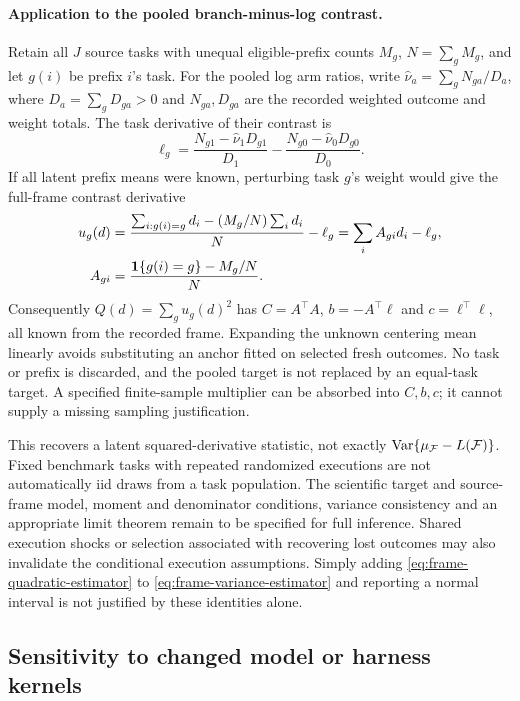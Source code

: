 \paragraph{Application to the pooled branch-minus-log contrast.}
Retain all $J$ source tasks with unequal eligible-prefix counts $M_g$, $N=\sum_gM_g$, and let $g(i)$ be prefix $i$'s task. For the pooled log arm ratios, write $\widehat\nu_a=\sum_gN_{ga}/D_a$, where $D_a=\sum_gD_{ga}>0$ and $N_{ga},D_{ga}$ are the recorded weighted outcome and weight totals. The task derivative of their contrast is
\[
 \ell_g=\frac{N_{g1}-\widehat\nu_1D_{g1}}{D_1}
 -\frac{N_{g0}-\widehat\nu_0D_{g0}}{D_0}.
\]
If all latent prefix means were known, perturbing task $g$'s weight would give the full-frame contrast derivative
\begin{equation}
 \begin{split}
 u_g(d)&=\frac{\sum_{i:g(i)=g}d_i-(M_g/N)\sum_i d_i}{N}-\ell_g
       =\sum_i A_{gi}d_i-\ell_g,\\
 A_{gi}&=\frac{\mathbf{1}\{g(i)=g\}-M_g/N}{N}.
 \end{split}
 \label{eq:frame-quadratic-derivative}
\end{equation}
Consequently $Q(d)=\sum_g u_g(d)^2$ has $C=A^\top A$, $b=-A^\top\ell$ and $c=\ell^\top\ell$, all known from the recorded frame. Expanding the unknown centering mean linearly avoids substituting an anchor fitted on selected fresh outcomes. No task or prefix is discarded, and the pooled target is not replaced by an equal-task target. A specified finite-sample multiplier can be absorbed into $C,b,c$; it cannot supply a missing sampling justification.

This recovers a latent squared-derivative statistic, not exactly $\operatorname{Var}\{\mu_{\mathcal F}-L(\mathcal F)\}$. Fixed benchmark tasks with repeated randomized executions are not automatically iid draws from a task population. The scientific target and source-frame model, moment and denominator conditions, variance consistency and an appropriate limit theorem remain to be specified for full inference. Shared execution shocks or selection associated with recovering lost outcomes may also invalidate the conditional execution assumptions. Simply adding \eqref{eq:frame-quadratic-estimator} to \eqref{eq:frame-variance-estimator} and reporting a normal interval is not justified by these identities alone.



\subsection{Sensitivity to changed model or harness kernels}
\label{sec:kernel-drift}

